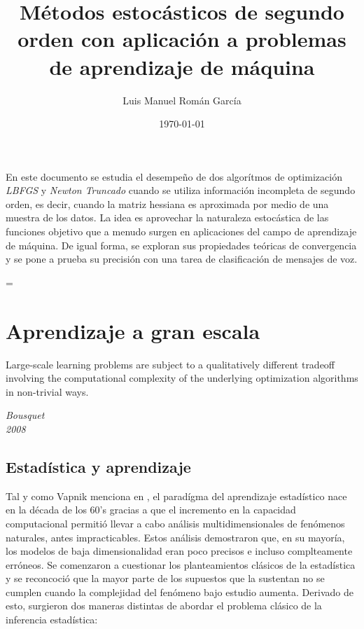\documentclass{book}
\title{Métodos estocásticos de segundo orden con aplicación a problemas de aprendizaje de máquina}
\author{Luis Manuel Román García}
\date{\today}
\makeatletter
\theoremstyle{plain}
\theoremstyle{definition}
\theoremstyle{remark}
\newenvironment{abstract}{%
      \titlepage
      \null\vfil
      \@beginparpenalty\@lowpenalty
      \begin{center}%
        \bfseries \abstractname
        \@endparpenalty\@M
      \end{center}}%
     {\par\vfil\null\endtitlepage}
\newenvironment{abstract}{%
      \if@twocolumn
        \section*{\abstractname}%
      \else
        \small
        \begin{center}%
          {\bfseries \abstractname\vspace{-.5em}\vspace{\z@}}%
        \end{center}%
        \quotation
      \fi}
      {\if@twocolumn\else\endquotation\fi}
\newenvironment{absolutelynopagebreak}
  {\par\nobreak\vfil\penalty0\vfilneg
   \vtop\bgroup}
  {\par\xdef\tpd{\the\prevdepth}\egroup
   \prevdepth=\tpd}
\makeatother
\begin{document}
\maketitle
\VerbatimFootnotes


\begin{absolutelynopagebreak}
\begin{abstract}
En este documento se estudia el desempeño de dos algorítmos de optimización \emph{LBFGS} y \emph{Newton Truncado} cuando se utiliza información incompleta de segundo orden, es decir, cuando la matriz hessiana es aproximada por medio de una muestra de los datos. La idea es aprovechar la naturaleza estocástica de las funciones objetivo que a menudo surgen en aplicaciones del campo de aprendizaje de máquina. De igual forma, se exploran sus propiedades teóricas de convergencia y se pone a prueba su precisión con una tarea de clasificación de mensajes de voz.
\end{abstract}
\end{absolutelynopagebreak}

\tableofcontents
{}


\chapter{Aprendizaje a gran escala}


\epigraph{Large-scale learning problems are subject to a qualitatively different tradeoff involving the computational complexity of the underlying optimization algorithms in non-trivial ways.}{\textit{Bousquet \\ 2008}}

\newpage

\section{Estadística y aprendizaje}

Tal y como Vapnik menciona en \cite{VAPNIK1}, el paradígma del aprendizaje estadístico nace en la década de los 60's gracias a que el incremento en la capacidad computacional permitió llevar a cabo análisis multidimensionales de fenómenos naturales, antes impracticables. Estos análisis demostraron que, en su mayoría, los modelos de baja dimensionalidad eran poco precisos e incluso complteamente erróneos. Se comenzaron a cuestionar los planteamientos clásicos de la estadística y se reconcoció que la mayor parte de los supuestos que la sustentan no se cumplen cuando la complejidad del fenómeno bajo estudio aumenta. Derivado de esto, surgieron dos maneras distintas de abordar el problema clásico de la inferencia estadística:
\end{document}
